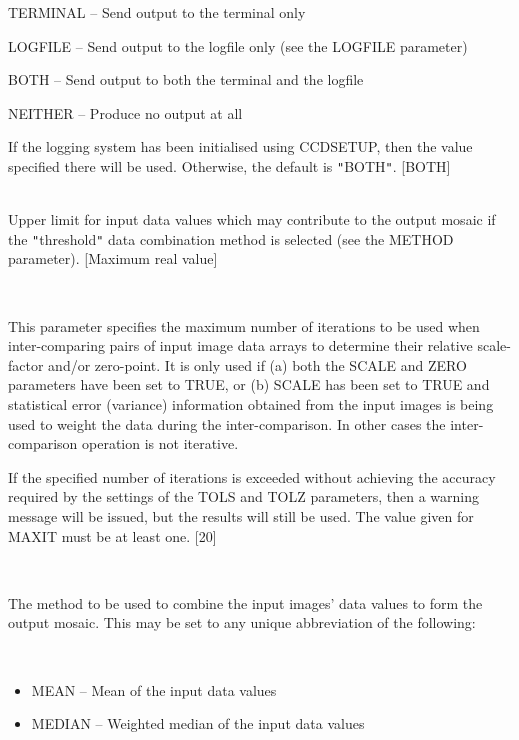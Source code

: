 \documentclass[twoside,11pt]{article}
\newcommand{\htmlref}[2]{#1}
\renewcommand{\_}{\texttt{\symbol{95}}}
\newcommand{\qt}[1]{{\tt "}#1{\tt "}}
\newcommand{\xroutine}[1]{\htmlref{{\sc #1}}{#1}}
\newcommand{\sstsubsection}[1]{ \item[{#1}] \mbox{} \\}
\newcommand{\sstitemlist}[1]{
  \mbox{} \\
  \vspace{-3.5ex}
  \begin{itemize}
     #1
  \end{itemize}
}
\newcommand{\sstitem}{\item}
\newcommand{\sstsubsection}[1]{\item[{#1}]}
\newcommand{\sstitemlist}[1]{
      \begin{itemize}
         #1
      \end{itemize}
      \\
   }
\newcommand{\sstitem}{\item}
\begin{document}
{{{{            \sstitem
               TERMINAL  -- Send output to the terminal only

            \sstitem
               LOGFILE   -- Send output to the logfile only (see the
                               LOGFILE parameter)

            \sstitem
               BOTH      -- Send output to both the terminal and the
                               logfile

            \sstitem
               NEITHER   -- Produce no output at all

         }
         If the logging system has been initialised using \xroutine{CCDSETUP},
         then the value specified there will be used. Otherwise, the
         default is \qt{BOTH}.
         [BOTH]
      }
      \sstsubsection{
         MAX = \_REAL (Read)
      } {
         Upper limit for input data values which may contribute to the
         output mosaic if the \qt{threshold} data combination method is
         selected (see the METHOD parameter). [Maximum real value]
      }
      \sstsubsection{
         MAXIT = \_INTEGER (Read)
      } {
         This parameter specifies the maximum number of iterations to
         be used when inter-comparing pairs of input image data arrays to
         determine their relative scale-factor and/or zero-point. It is
         only used if (a) both the SCALE and ZERO parameters have been
         set to TRUE, or (b) SCALE has been set to TRUE and statistical
         error (variance) information obtained from the input images is
         being used to weight the data during the inter-comparison. In
         other cases the inter-comparison operation is not iterative.

         If the specified number of iterations is exceeded without
         achieving the accuracy required by the settings of the TOLS
         and TOLZ parameters, then a warning message will be issued,
         but the results will still be used. The value given for MAXIT
         must be at least one.
         [20]
      }
      \sstsubsection{
         METHOD = LITERAL (Read)
      } {
         The method to be used to combine the input images' data values
         to form the output mosaic. This may be set to any unique
         abbreviation of the following:
         \sstitemlist{

            \sstitem
               MEAN      -- Mean of the input data values

            \sstitem
               MEDIAN    -- Weighted median of the input data values

}}}}
\end{document}
